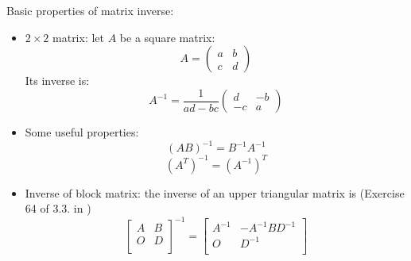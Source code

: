 \documentclass{report}
\begin{document}
Basic properties of matrix inverse: 
\begin{itemize}
\item $2 \times 2$ matrix: let $A$ be a square matrix: 
\begin{equation}
A = \left(
\begin{array}{ll}
a & b\\
c & d
\end{array}
\right)		
\end{equation}
Its inverse is: 
\begin{equation}
A^{-1} = \frac{1}{ad - bc} \left(
\begin{array}{ll}
d & -b\\
-c & a
\end{array}	
\right)		
\end{equation}

\item Some useful properties: 
\begin{equation}
(AB)^{-1}	= B^{-1} A^{-1}
\end{equation}
\begin{equation}
(A^T)^{-1} = (A^{-1})^T
\end{equation}

\item Inverse of block matrix: the inverse of an upper triangular matrix is (Exercise 64 of 3.3. in \cite{Poole06})
\begin{equation}
\left[
\begin{array}{ll}
A & B\\
O & D \\
\end{array}
\right]^{-1} = \left[
\begin{array}{ll}
A^{-1} & -A^{-1}BD^{-1}\\
O & D^{-1} \\
\end{array}
\right]
\end{equation}
\end{itemize}
\end{document}

